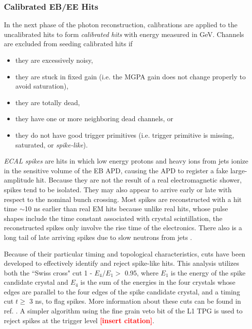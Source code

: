 \documentclass[dissertation.tex]{subfiles}
\begin{document}
\subsubsection{Calibrated EB/EE Hits}
\label{sec:Calibrated EB/EE Hits}

In the next phase of the photon reconstruction, calibrations are applied to the uncalibrated hits to form \textit{calibrated hits} with energy measured in GeV.  Channels are excluded from seeding calibrated hits if

\begin{itemize}
\item they are excessively noisy,
\item they are stuck in fixed gain (i.e. the MGPA gain does not change properly to avoid saturation),
\item they are totally dead,
\item they have one or more neighboring dead channels, or
\item they do not have good trigger primitives (i.e. trigger primitive is missing, saturated, or \textit{spike-like}).
\end{itemize}

\marginpar{\textcolor{blue}{Added this paragraph and the next about spikes}}\textit{ECAL spikes} are hits in which low energy protons and heavy ions from jets ionize in the sensitive volume of the EB APD, causing the APD to register a fake large-amplitude hit.  Because they are not the result of a real electromagnetic shower, spikes tend to be isolated.  They may also appear to arrive early or late with respect to the nominal bunch crossing.  Most spikes are reconstructed with a hit time $\sim$10 ns earlier than real EM hits because unlike real hits, whose pulse shapes include the time constant associated with crystal scintillation, the reconstructed spikes only involve the rise time of the electronics.  There also is a long tail of late arriving spikes due to slow neutrons from jets \cite{EGM_10_002}.

Because of their particular timing and topological characteristics, cuts have been developed to effectively identify and reject spike-like hits.  This analysis utilizes both the ``Swiss cross" cut 1 - $E_{4}/E_{1} >$ 0.95, where $E_{1}$ is the energy of the spike candidate crystal and $E_{4}$ is the sum of the energies in the four crystals whose edges are parallel to the four edges of the spike candidate crystal, and a timing cut $t \geq$ 3 ns, to flag spikes.  More information about these cuts can be found in ref. \cite{EGM_10_002}.  A simpler algorithm using the fine grain veto bit of the L1 TPG is used to reject spikes at the trigger level \textcolor{red}{\textbf{[insert citation]}}.
\end{document}
